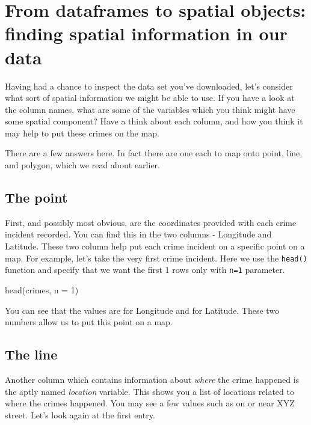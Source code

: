 \documentclass[
]{book}
\newenvironment{Shaded}{\begin{snugshade}}{\end{snugshade}}
\newcommand{\AttributeTok}[1]{\textcolor[rgb]{0.77,0.63,0.00}{#1}}
\newcommand{\DecValTok}[1]{\textcolor[rgb]{0.00,0.00,0.81}{#1}}
\newcommand{\FunctionTok}[1]{\textcolor[rgb]{0.00,0.00,0.00}{#1}}
\newcommand{\NormalTok}[1]{#1}
\begin{document}
\hypertarget{from-dataframes-to-spatial-objects-finding-spatial-information-in-our-data}{%
\section{From dataframes to spatial objects: finding spatial information in our data}\label{from-dataframes-to-spatial-objects-finding-spatial-information-in-our-data}}

Having had a chance to inspect the data set you've downloaded, let's consider what sort of spatial information we might be able to use. If you have a look at the column names, what are some of the variables which you think might have some spatial component? Have a think about each column, and how you think it may help to put these crimes on the map.

There are a few answers here. In fact there are one each to map onto point, line, and polygon, which we read about earlier.

\hypertarget{the-point}{%
\subsection{The point}\label{the-point}}

First, and possibly most obvious, are the coordinates provided with each crime incident recorded. You can find this in the two columns - Longitude and Latitude. These two column help put each crime incident on a specific point on a map. For example, let's take the very first crime incident. Here we use the \texttt{head()} function and specify that we want the first 1 rows only with \texttt{n=1} parameter.

\begin{Shaded}
\begin{Highlighting}[]
\FunctionTok{head}\NormalTok{(crimes, }\AttributeTok{n =} \DecValTok{1}\NormalTok{)}
\end{Highlighting}
\end{Shaded}

You can see that the values are for Longitude and for Latitude. These two numbers allow us to put this point on a map.

\hypertarget{the-line}{%
\subsection{The line}\label{the-line}}

Another column which contains information about \emph{where} the crime happened is the aptly named \emph{location} variable. This shows you a list of locations related to where the crimes happened. You may see a few values such as on or near XYZ street. Let's look again at the first entry.
\end{document}

